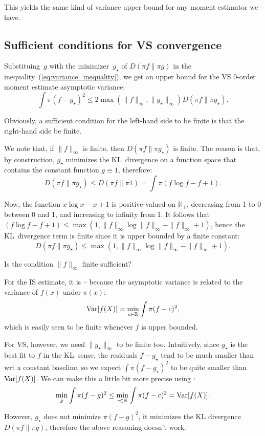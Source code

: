 \documentclass{article}
\begin{document}
This yields the same kind of variance upper bound for any moment estimator we have.


\subsection{Sufficient conditions for VS convergence}

Substituing~$g$ with the minimizer~$g_\star$ of $D(\pi f\|\pi g)$ in the inequality~(\ref{eq:variance_inequality}), we get an upper bound for the VS 0-order moment estimate asymptotic variance:
$$
\int \pi (f-g_\star)^2
\leq
2\max(\|f\|_\infty, \|g_\star\|_\infty)
D(\pi f\|\pi g_\star)
.
$$

Obviously, a sufficient condition for the left-hand side to be finite is that the right-hand side be finite.

We note that, if $\|f\|_\infty$ is finite, then $D(\pi f\|\pi g_\star)$ is finite. The reason is that, by construction, $g_\star$ minimizes the KL~divergence on a function space that contains the constant function $g\equiv 1$, therefore:
$$
D(\pi f\|\pi g_\star)
\leq
D(\pi f\|\pi 1)
=
\int \pi (f\log f - f + 1)
.
$$

Now, the function $x\log x - x + 1$ is positive-valued on $\mathbb{R}_+$, decreasing from 1 to 0 between 0 and 1, and increasing to infinity from 1. It follows that $(f\log f - f + 1)\leq \max(1, \|f\|_\infty \log \|f\|_\infty - \|f\|_\infty + 1)$, hence the KL~divergence term is finite since it is upper bounded by a finite constant:
$$
D(\pi f\|\pi g_\star) \leq
\max(1, \|f\|_\infty \log \|f\|_\infty - \|f\|_\infty + 1)
.
$$

Is the condition $\|f\|_\infty$ finite sufficient?

For the IS estimate, it is -- because the asymptotic variance is related to the variance of $f(x)$ under $\pi(x)$:
$$
{\rm Var}[f(X)]
= \min_{c\in\mathbb{R}} \int \pi (f - c)^2,
$$
which is easily seen to be finite whenever $f$ is upper bounded. 

For VS, however, we need $\|g_\star\|_\infty$ to be finite too. Intuitively, since $g_\star$ is the best fit to $f$ in the KL~sense, the residuals $f-g_\star$ tend to be much smaller than wrt a constant baseline, so we expect $\int \pi(f-g_\star)^2$ to be quite smaller than ${\rm Var}[f(X)]$. We can make this a little bit more precise using :
$$
\min_g \int \pi (f-g)^2 \leq \min_{c\in\mathbb{R}} \int \pi (f-c)^2 = {\rm Var}[f(X)].
$$

However, $g_\star$ does not minimize $\pi (f-g)^2$, it minimizes the KL divergence $D(\pi f\|\pi g)$, therefore the above reasoning doesn't work.
\end{document}
